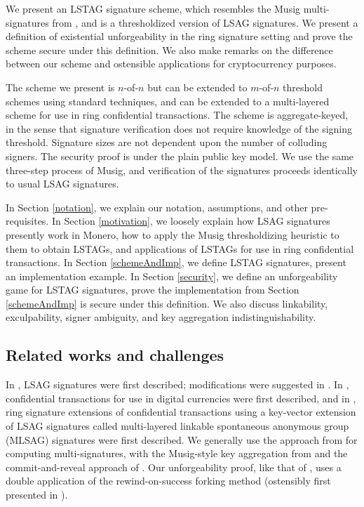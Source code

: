\documentclass{mrl}
\theoremstyle{definition}
\numberwithin{theorem}{subsection}
\begin{document}
We present an LSTAG signature scheme, which resembles the Musig multi-signatures from \cite{maxwell2018simple}, and is a thresholdized version of LSAG signatures. We present a definition of existential unforgeability in the ring signature setting and prove the scheme secure under this definition. We also make remarks on the difference between our scheme and ostensible applications for cryptocurrency purposes. 

The scheme we present is $n$-of-$n$ but can be extended to $m$-of-$n$ threshold schemes using standard techniques, and can be extended to a multi-layered scheme for use in ring confidential transactions. The scheme is aggregate-keyed, in the sense that signature verification does not require knowledge of the signing threshold. Signature sizes are not dependent upon the number of colluding signers. The security proof is under the plain public key model. We use the same three-step process of Musig, and verification of the signatures proceeds identically to usual LSAG signatures.

In Section \ref{notation}, we explain our notation, assumptions, and other pre-requisites. In Section \ref{motivation}, we loosely explain how LSAG signatures presently work in Monero, how to apply the Musig thresholdizing heuristic to them to obtain LSTAGs, and applications of LSTAGs for use in ring confidential transactions. In Section \ref{schemeAndImp}, we define LSTAG signatures, present an implementation example. In Section \ref{security}, we define an unforgeability game for LSTAG signatures, prove the implementation from Section \ref{schemeAndImp} is secure under this definition. We also discuss linkability, exculpability, signer ambiguity, and key aggregation indistinguishability. 


\subsection{Related works and challenges}

In \cite{liu2004linkable}, LSAG signatures were first described; modifications were suggested in \cite{backLSAG}.
In \cite{maxwell2015confidential}, confidential transactions for use in digital currencies were first described, and in \cite{noether2016ring}, ring signature extensions of confidential transactions using a key-vector extension of LSAG signatures called multi-layered linkable spontaneous anonymous group (MLSAG) signatures were first described. We generally use the approach from \cite{bellare2006multi} for computing multi-signatures, with the Musig-style key aggregation from \cite{qian2010non} and the commit-and-reveal approach of \cite{maxwell2018simple}. Our unforgeability proof, like that of \cite{maxwell2018simple}, uses a double application of the rewind-on-success forking method (ostensibly first presented in \cite{liu2004linkable}). 
\end{document}
